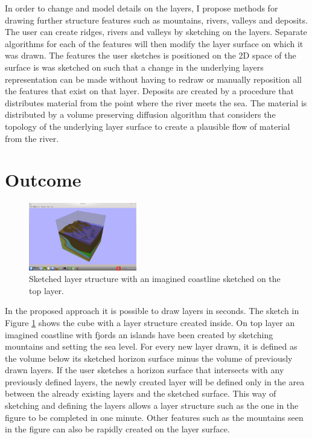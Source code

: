\documentclass[a4paper,12pt]{report}
\begin{document}
In order to change and model details on the layers, I propose methods for drawing further structure features such as mountains, rivers, valleys and deposits. The user can create ridges, rivers and valleys by sketching on the layers. Separate algorithms for each of the features will then modify the layer surface on which it was drawn. The features the user sketches is positioned on the 2D space of the surface is was sketched on such that a change in the underlying layers representation can be made without having to redraw or manually reposition all the features that exist on that layer. Deposits are created by a procedure that distributes material from the point where the river meets the sea. The material is distributed by a volume preserving diffusion algorithm that considers the topology of the underlying layer surface to create a plausible flow of material from the river.

\section{Outcome}
\begin{figure}

  \begin{center}
    \includegraphics[trim = 80mm 20mm 80mm 25mm, clip,width=0.42\textwidth]{thesis/introSketch.png}
  \end{center}
 
  \caption{Sketched layer structure with an imagined coastline sketched on the top layer.}
  \vspace{15pt}
  \label{fig:introSketch}
  
\end{figure}
In the proposed approach it is possible to draw layers in seconds.  The sketch in Figure \ref{fig:introSketch} shows the cube with a layer structure created inside.  On top layer an imagined coastline with fjords an islands have been created by sketching mountains and setting the sea level. For every new layer drawn, it is defined as the volume below its sketched horizon surface minus the volume of previously drawn layers. If the user sketches a horizon surface that intersects with any previously defined layers, the newly created layer will be defined only in the area between the already existing layers and the sketched surface. This way of sketching and defining the layers allows a layer structure such as the one in the figure to be completed in one minute. Other features such as the mountains seen in the figure can also be rapidly  created on the layer surface.
\end{document}
